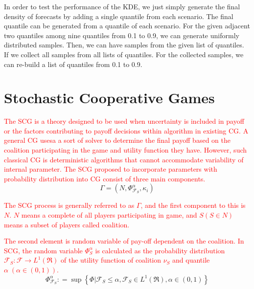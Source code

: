 \documentclass[journal]{IEEEtran} %
\begin{document}
In order to test the performance of the KDE, we just simply generate the final density of forecasts by adding a single quantile from each scenario. The final quantile can be generated from a quantile of each scenario. For the given adjacent two quantiles among nine quantiles from 0.1 to 0.9, we can generate uniformly distributed samples. Then, we can have samples from the given list of quantiles. If we collect all samples from all lists of quantiles. For the collected samples, we can re-build a list of quantiles from 0.1 to 0.9.


\section{Stochastic Cooperative Games}
\textcolor{red}{The SCG is a theory designed to be used when uncertainty is included in payoff or the factors contributing to payoff decisions within algorithm in existing CG. A general CG usesa a sort of solver to determine the final payoff based on the coalition participating in the game and utility function they have. However, such classical CG is deterministic algorithms that cannot accommodate variability of internal parameter. The SCG proposed to incorporate parameters with probability distribution into CG consist of three main components.}
\begin{equation}
\Gamma  = (N,{\Phi_{\mathcal{F}_S}^\alpha},{\kappa _i})
\end{equation}
 
\textcolor{red}{The SCG process is generally referred to as $\Gamma$, and the first component to this is $N$. $N$ means a complete of all players participating in game, and $S (S \in N)$ means a subset of players called coalition.}

\textcolor{red}{The second element is random variable of pay-off dependent on the coalition. In SCG, the random variable ${\Phi_S^\alpha}$ is calculated as the probability distribution ${\mathcal{F}_S}: {\mathcal{F}} \to {L^1}(\Re )$ of the utility function of coalition $\nu_S$ and quantile $\alpha\;(\alpha \in (0, 1))$.}
\begin{equation}
\Phi _{{\mathcal{F}_S}}^\alpha : = \sup \left\{ {\Phi |{\mathcal{F}_S} \le \alpha ,{\mathcal{F}_S} \in {L^1}(\Re ),\alpha  \in (0,1)} \right\}
\end{equation}
\end{document}
